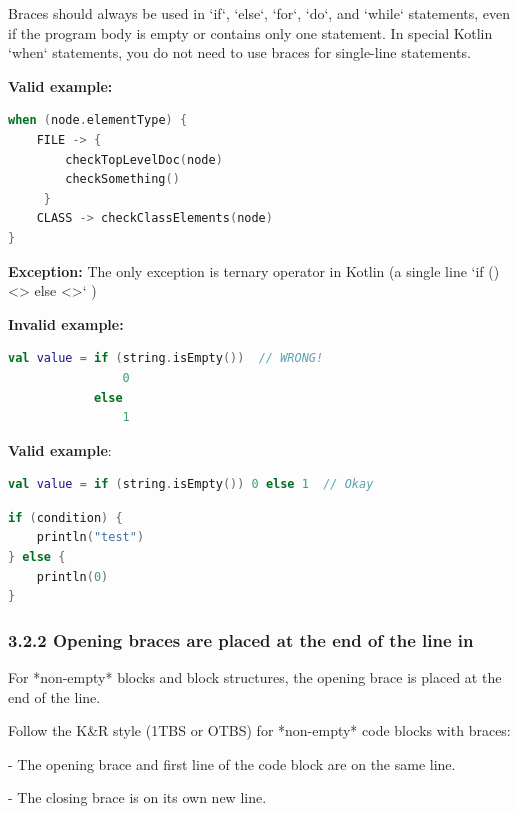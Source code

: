 Braces should always be used in `if`, `else`, `for`, `do`, and `while` statements, even if the program body is empty or contains only one statement. In special Kotlin `when` statements, you do not need to use braces for single-line statements. 



\textbf{Valid example:}



\begin{lstlisting}[language=Kotlin]
when (node.elementType) {
    FILE -> {
        checkTopLevelDoc(node)
        checkSomething()
     }
    CLASS -> checkClassElements(node)
}
\end{lstlisting}
\textbf{Exception:} The only exception is ternary operator in Kotlin (a single line `if () <> else <>` ) 



\textbf{Invalid example:}



\begin{lstlisting}[language=Kotlin]
val value = if (string.isEmpty())  // WRONG!
                0
            else
                1
\end{lstlisting}


\textbf{Valid example}: 



\begin{lstlisting}[language=Kotlin]
val value = if (string.isEmpty()) 0 else 1  // Okay
\end{lstlisting}


\begin{lstlisting}[language=Kotlin]
if (condition) {
    println("test")
} else {
    println(0)
}
\end{lstlisting}


\subsubsection*{\textbf{3.2.2  Opening braces are placed at the end of the line in}}
\leavevmode\newline

For *non-empty* blocks and block structures, the opening brace is placed at the end of the line.

Follow the K\&R style (1TBS or OTBS) for *non-empty* code blocks with braces:

- The opening brace and first line of the code block are on the same line.

- The closing brace is on its own new line.

